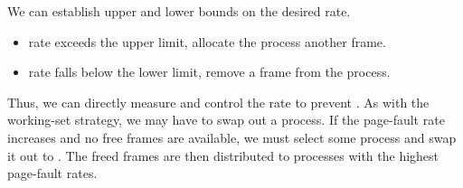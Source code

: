 We can establish upper and lower bounds on the desired  rate.
\begin{itemize}[noitemsep]
\item {} rate exceeds the upper limit, allocate the process another frame.
\item {} rate falls below the lower limit, remove a frame from the process.
\end{itemize}

Thus, we can directly measure and control the  rate to prevent .
As with the working-set strategy, we may have to swap out a process.
If the page-fault rate increases and no free frames are available, we must select some process and swap it out to .
The freed frames are then distributed to processes with the highest page-fault rates.

